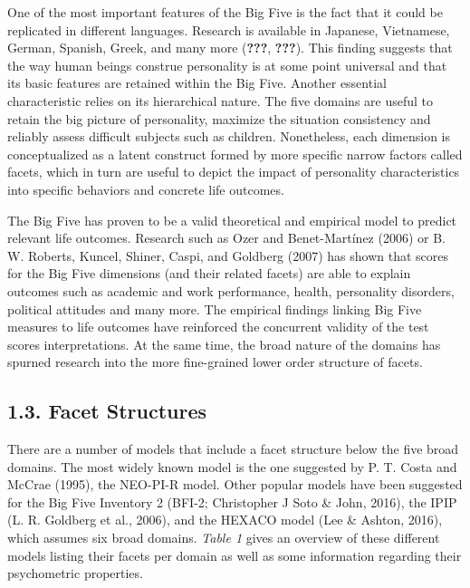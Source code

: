 \documentclass[,man,floatsintext]{apa6}
\begin{document}
One of the most important features of the Big Five is the fact that it
could be replicated in different languages. Research is available in
Japanese, Vietnamese, German, Spanish, Greek, and many more
({\textbf{???}}, {\textbf{???}}). This finding suggests that the way
human beings construe personality is at some point universal and that
its basic features are retained within the Big Five. Another essential
characteristic relies on its hierarchical nature. The five domains are
useful to retain the big picture of personality, maximize the situation
consistency and reliably assess difficult subjects such as children.
Nonetheless, each dimension is conceptualized as a latent construct
formed by more specific narrow factors called facets, which in turn are
useful to depict the impact of personality characteristics into specific
behaviors and concrete life outcomes.

The Big Five has proven to be a valid theoretical and empirical model to
predict relevant life outcomes. Research such as Ozer and Benet-Martínez
(2006) or B. W. Roberts, Kuncel, Shiner, Caspi, and Goldberg (2007) has
shown that scores for the Big Five dimensions (and their related facets)
are able to explain outcomes such as academic and work performance,
health, personality disorders, political attitudes and many more. The
empirical findings linking Big Five measures to life outcomes have
reinforced the concurrent validity of the test scores interpretations.
At the same time, the broad nature of the domains has spurned research
into the more fine-grained lower order structure of facets.

\subsection{1.3. Facet Structures}\label{facet-structures}

There are a number of models that include a facet structure below the
five broad domains. The most widely known model is the one suggested by
P. T. Costa and McCrae (1995), the NEO-PI-R model. Other popular models
have been suggested for the Big Five Inventory 2 (BFI-2; Christopher J
Soto \& John, 2016), the IPIP (L. R. Goldberg et al., 2006), and the
HEXACO model (Lee \& Ashton, 2016), which assumes six broad domains.
\emph{Table 1} gives an overview of these different models listing their
facets per domain as well as some information regarding their
psychometric properties.

\vspace{5mm}
\end{document}
